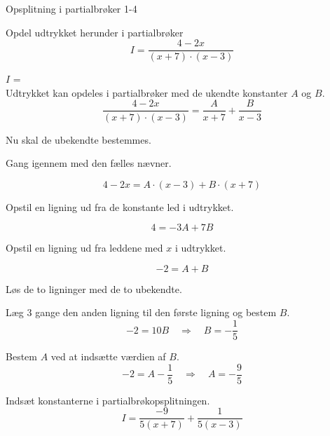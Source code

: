 \documentclass{article}
\begin{document}
\begin{exercise}{Opsplitning i partialbrøker 1-4}
	
	Opdel udtrykket herunder i partialbrøker
	\[
	I = \frac{4 - 2x}{(x + 7) \cdot (x - 3)}
	\]
	
	$I$ =  \\
	
	\hint
	Udtrykket kan opdeles i partialbrøker med de ukendte konstanter $A$ og $B$.
	\[
	\frac{4 - 2x}{(x + 7) \cdot (x - 3)} = 
	\frac{A}{x + 7} + \frac{B}{x - 3}
	\]
	
	\hint
	Nu skal de ubekendte bestemmes.
	
	\hint
	Gang igennem med den fælles nævner.
	
	\hint
	\[
	4 - 2x = A \cdot (x - 3) + B \cdot (x + 7)
	\]
	
	\hint
	Opstil en ligning ud fra de konstante led i udtrykket.
	
	\hint
	\[
	4 = -3A + 7B
	\]
	
	\hint
	Opstil en ligning ud fra leddene med $x$ i udtrykket.
	
	\hint
	\[
	-2 = A + B
	\]
	
	\hint
	Løs de to ligninger med de to ubekendte.
	
	\hint
	Læg 3 gange den anden ligning til den første ligning og bestem $B$.
	\[
	-2 = 10B \quad	\Rightarrow		\quad		B = -\frac{1}{5}
	\]
	
	\hint
	Bestem $A$ ved at indsætte værdien af $B$.
	\[
	-2 =  A - \frac{1}{5} \quad 	\Rightarrow		\quad A = -\frac{9}{5}
	\]
	
	\hint
	Indsæt konstanterne i partialbrøkopsplitningen.
	\[
	I = \frac{-9}{5(x+7)} + \frac{1}{5(x-3)}
	\]
	
	
	
\end{exercise}
\end{document}
